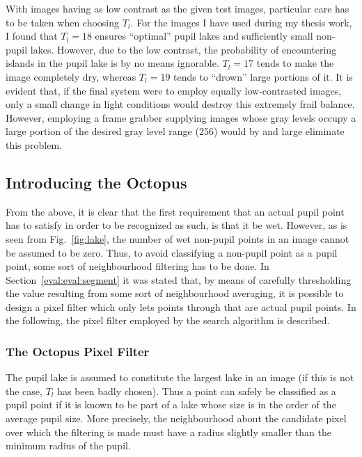 With images having as low contrast as the given test images,
particular care has to be taken when choosing $T_{l}$.  For the images
I have used during my thesis work, I found that $T_{l}=18$ ensures
``optimal'' pupil lakes and sufficiently small non-pupil lakes.
However, due to the low contrast, the probability of encountering
islands in the pupil lake is by no means ignorable.  $T_{l}=17$ tends
to make the image completely dry, whereas $T_{l}=19$ tends to
``drown'' large portions of it.  It is evident that, if the final
system were to employ equally low-contrasted images, only a small
change in light conditions would destroy this extremely frail balance.
However, employing a frame grabber supplying images whose gray levels
occupy a large portion of the desired gray level range (256) would by
and large eliminate this problem.


\subsection{Introducing the Octopus}
\label{algo:seek:octopus}

From the above, it is clear that the first requirement that an actual
pupil point has to satisfy in order to be recognized as such, is that
it be wet.  However, as is seen from Fig.~\ref{fig:lake}, the number
of wet non-pupil points in an image cannot be assumed to be zero.
Thus, to avoid classifying a non-pupil point as a pupil point, some
sort of neighbourhood filtering has to be done.  In
Section~\ref{eval:eval:segment} it was stated that, by means of
carefully thresholding the value resulting from some sort of
neighbourhood averaging, it is possible to design a pixel filter which
only lets points through that are actual pupil points.  In the
following, the pixel filter employed by the search algorithm is
described.

\subsubsection{The Octopus Pixel Filter}

The pupil lake is assumed to constitute the largest lake in an image
(if this is not the case, $T_{l}$ has been badly chosen).  Thus a point
can safely be classified as a pupil point if it is known to be part of
a lake whose size is in the order of the average pupil size.  More
precisely, the neighbourhood about the candidate pixel over which the
filtering is made must have a radius slightly smaller than the minimum
radius of the pupil.  

